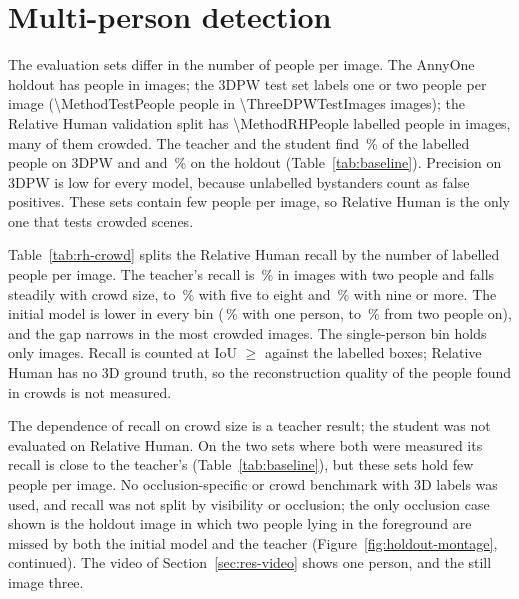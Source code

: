 
\section{Multi-person detection}
\label{sec:res-multiperson}



The evaluation sets differ in the number of people per image. The AnnyOne holdout has \MethodHoldoutPeople{} people
in \MethodHoldoutN{} images; the 3DPW test set labels one or two people per image (\num{\MethodTestPeople} people in
\num{\ThreeDPWTestImages} images); the Relative Human validation split has \num{\MethodRHPeople} labelled people in
\MethodRHImages{} images, many of them crowded. The teacher and the student find \FinalRecallThreeDPW\,\% of the
labelled people on 3DPW and \FinalRecall{} and \StudentRecall\,\% on the holdout (Table~\ref{tab:baseline}). Precision on 3DPW is low for every model, because unlabelled bystanders count as false
positives. These sets contain few people per image, so Relative Human is the only one that tests crowded scenes.

Table~\ref{tab:rh-crowd} splits the Relative Human recall by the number of labelled people per image. The teacher's
recall is \CrowdFinalTwoRec\,\% in images with two people and falls steadily with crowd size, to
\CrowdFinalFiveEightRec\,\% with five to eight and \CrowdFinalNinePlusRec\,\% with nine or more. The initial model is
lower in every bin (\CrowdBaseOneRec\,\% with one person, \CrowdBaseTwoRec{} to \CrowdBaseNinePlusRec\,\% from two
people on), and the gap narrows in the most crowded images. The single-person bin holds only \CrowdOneImages{}
images. Recall is counted at IoU $\geq$ \MethodRHIoU{} against the labelled boxes; Relative Human has no 3D ground
truth, so the reconstruction quality of the people found in crowds is not measured.

The dependence of recall on crowd size is a teacher result; the student was not evaluated on Relative Human. On the
two sets where both were measured its recall is close to the teacher's (Table~\ref{tab:baseline}), but these sets
hold few people per image. No occlusion-specific or crowd benchmark with 3D labels
was used, and recall was not split by visibility or occlusion; the only occlusion case shown is the holdout image in which two people lying in the foreground are missed by both
the initial model and the teacher (Figure~\ref{fig:holdout-montage}, continued). The video of
Section~\ref{sec:res-video} shows one person, and the still image three.

